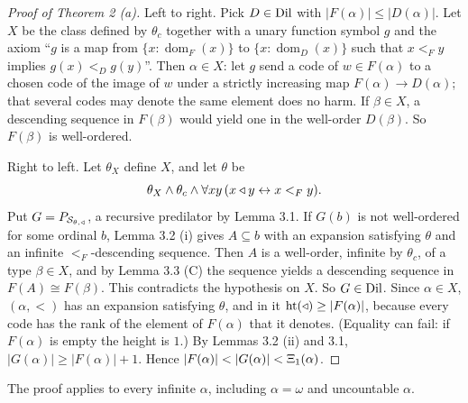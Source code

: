 \documentclass[11pt]{article}
\begin{document}
\begin{proof}[Proof of Theorem 2 (a)] Left to right. Pick $D \in \mathrm{Dil}$ with $|F(\alpha)| \le |D(\alpha)|$. Let $X$
be the class defined by $\theta_c$ together with a unary function symbol $g$ and the axiom ``$g$ is a map from $\{x : \operatorname{dom}_F(x)\}$ to
$\{x : \operatorname{dom}_D(x)\}$ such that $x <_F y$ implies $g(x) <_D g(y)$''. Then $\alpha \in X$: let $g$ send a
code of $w \in F(\alpha)$ to a chosen code of the image of $w$ under a strictly increasing map $F(\alpha) \to D(\alpha)$;
that several codes may denote the same element does no harm. If $\beta \in X$, a descending
sequence in $F(\beta)$ would yield one in the well-order $D(\beta)$. So $F(\beta)$ is well-ordered.

Right to left. Let $\theta_X$ define $X$, and let $\theta$ be
\[ \theta_X \wedge \theta_c \wedge \forall x y\, (x \triangleleft y \leftrightarrow x <_F y) . \]
Put $G = P_{\mathcal S_{\theta, \triangleleft}}$, a recursive predilator by Lemma 3.1. If $G(b)$ is not well-ordered for
some ordinal $b$, Lemma 3.2 (i) gives $A \subseteq b$ with an expansion satisfying $\theta$ and an infinite
$<_F$-descending sequence. Then $A$ is a well-order, infinite by $\theta_c$, of a type $\beta \in X$, and by Lemma
3.3 (C) the sequence yields a descending sequence in $F(A) \cong F(\beta)$. This contradicts the hypothesis on $X$.
So $G \in \mathrm{Dil}$. Since $\alpha \in X$, $(\alpha, <)$ has an expansion satisfying $\theta$, and in it
$\operatorname{ht}(\triangleleft) \ge |F(\alpha)|$, because every code has the rank of the element of $F(\alpha)$ that it denotes.
(Equality can fail: if $F(\alpha)$ is empty the height is $1$.) By Lemmas 3.2 (ii) and 3.1, $|G(\alpha)| \ge |F(\alpha)| + 1$. Hence
$|F(\alpha)| < |G(\alpha)| < \Xi_1(\alpha)$.
\end{proof}

The proof applies to every infinite $\alpha$, including $\alpha = \omega$ and uncountable $\alpha$.
\end{document}
